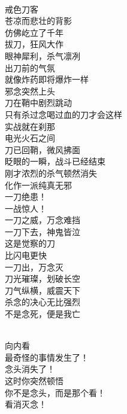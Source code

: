 \begin{poem}[觉·刀]
    \begin{multicols}{3}
        \begin{center}~\\
            戒色刀客 \\ 苍凉而悲壮的背影 \\ 仿佛屹立了千年 \\ 拔刀，狂风大作 \\ 眼神犀利，杀气凛冽 \\ 出刀前的气氛 \\ 就像炸药即将爆炸一样 \\ 邪念突然上头 \\ 刀在鞘中剧烈跳动 \\ 只有杀过念喝过血的刀才会这样 \\ 实战就在刹那 \\ 电光火石之间 \\ 刀已回鞘，微风拂面 \\ 眨眼的一瞬，战斗已经结束 \\ 刚才浓烈的杀气顿然消失 \\ 化作一派纯真无邪 \\ 一刀绝患！ \\ 一战惊人！ \\ 一刀之威，万念难挡 \\ 一刀下去，神鬼皆泣 \\ 这是觉察的刀 \\ 比闪电更快 \\ 一刀出，万念灭 \\ 刀光璀璨，划破长空 \\ 刀气纵横，威震天下 \\ 杀念的决心无比强烈 \\ 不是念死，便是我亡
        \end{center}
    \end{multicols}
\end{poem}

\begin{poem}[那个看]
    \begin{multicols}{3}
        \begin{center}~\\
            向内看 \\ 最奇怪的事情发生了！ \\ 念头消失了！ \\ 这时你突然顿悟 \\ 你不是念头，而是那个看！ \\ 看消灭念！
        \end{center}
    \end{multicols}
\end{poem}

